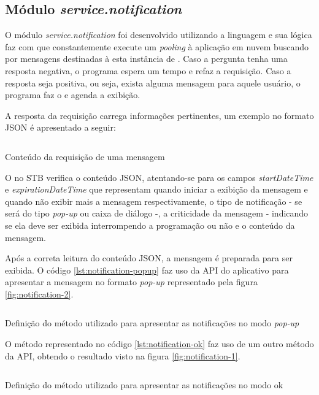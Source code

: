\subsection{Módulo \textit{service.notification}}\label{subsec:notification}

O módulo \textit{service.notification} foi desenvolvido utilizando a linguagem
\python[] e sua lógica faz com que constantemente execute um \textit{pooling} 
à aplicação em nuvem buscando por mensagens destinadas à esta instância de 
\software. Caso a pergunta tenha uma resposta negativa, o programa espera um 
tempo e refaz a requisição. Caso a resposta seja positiva, ou seja, exista 
alguma mensagem para aquele usuário, o programa faz o \download[] e agenda a
exibição. 

A resposta da requisição carrega informações pertinentes, um exemplo no formato
JSON é apresentado a seguir:

\begin{listing}[ht!]
\inputminted{json}{codigos/message.json}
\caption{Conteúdo da requisição de uma mensagem}
\label{lst:notification-json}
\end{listing}

O \software[] no STB verifica o conteúdo JSON, atentando-se para os campos 
\textit{startDateTime} e \textit{expirationDateTime} que representam quando 
iniciar a exibição da mensagem e quando não exibir mais a mensagem 
respectivamente, o tipo de notificação - se será do tipo \textit{pop-up} ou
caixa de diálogo -, a criticidade da mensagem - indicando se ela deve ser
exibida interrompendo a programação ou não e o conteúdo da mensagem. 

Após a correta leitura do conteúdo JSON, a mensagem é preparada para ser 
exibida. O código \ref{lst:notification-popup} faz uso da API do aplicativo
\xbmc[] para apresentar a mensagem no formato \textit{pop-up} representado pela
figura \ref{fig:notification-2}.

\begin{listing}[ht!]
\inputminted{python}{codigos/notification-popup.py}
\caption{Definição do método utilizado para apresentar as notificações no modo
\textit{pop-up}}
\label{lst:notification-popup}
\end{listing}

O método representado no código \ref{lst:notification-ok} faz uso de um outro 
método da API, obtendo o resultado visto na figura \ref{fig:notification-1}.

\begin{listing}[ht!]
\inputminted{python}{codigos/notification-ok.py}
\caption{Definição do método utilizado para apresentar as notificações no modo
ok}
\label{lst:notification-ok}
\end{listing}


